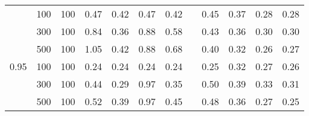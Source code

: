 \begin{longtable}{lp{0.5cm}|p{0.5cm}p{0.5cm}p{0.5cm}p{0.5cm}p{0.5cm}p{0.5cm}p{0.5cm}p{0.5cm}p{0.5cm}}
\bottomrule
{} & 100 & 100 &    0.47 &            0.42 &            0.47 &           0.42 &                   &                      0.45 &                      0.37 &                       0.28 &                    0.28 \\
     & 300 & 100 &    0.84 &            0.36 &            0.88 &           0.58 &                   &                      0.43 &                      0.36 &                       0.30 &                    0.30 \\
     & 500 & 100 &    1.05 &            0.42 &            0.88 &           0.68 &                   &                      0.40 &                      0.32 &                       0.26 &                    0.27 \\
0.95 & 100 & 100 &    0.24 &            0.24 &            0.24 &           0.24 &                   &                      0.25 &                      0.32 &                       0.27 &                    0.26 \\
     & 300 & 100 &    0.44 &            0.29 &            0.97 &           0.35 &                   &                      0.50 &                      0.39 &                       0.33 &                    0.31 \\
     & 500 & 100 &    0.52 &            0.39 &            0.97 &           0.45 &                   &                      0.48 &                      0.36 &                       0.27 &                    0.25 \\
\end{longtable}
